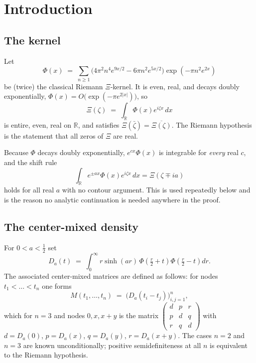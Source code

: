 \documentclass[11pt,a4paper]{amsart}
\theoremstyle{plain}
\theoremstyle{definition}
\newcommand{\RR}{\mathbb{R}}
\newcommand{\Xii}{\Xi}
\begin{document}
\maketitle

\section{Introduction}

\subsection{The kernel}
Let
\begin{equation}\label{eq:phi}
  \Phi(x)\;=\;\sum_{n\ge1}\bigl(4\pi^2n^4e^{9x/2}-6\pi n^2e^{5x/2}\bigr)\exp\!\left(-\pi n^2e^{2x}\right)
\end{equation}
be (twice) the classical Riemann $\Xii$-kernel. It is even, real, and decays doubly exponentially,
$\Phi(x)=O\bigl(\exp(-\pi e^{2|x|})\bigr)$, so
\begin{equation}\label{eq:xi}
  \Xii(\zeta)\;=\;\int_\RR\Phi(x)e^{i\zeta x}\,dx
\end{equation}
is entire, even, real on $\RR$, and satisfies $\Xii(\bar\zeta)=\overline{\Xii(\zeta)}$. The Riemann
hypothesis is the statement that all zeros of $\Xii$ are real.

Because $\Phi$ decays doubly exponentially, $e^{cx}\Phi(x)$ is integrable for \emph{every} real $c$,
and the shift rule
\begin{equation}\label{eq:shift}
  \int_\RR e^{\pm ax}\Phi(x)e^{i\zeta x}\,dx=\Xii(\zeta\mp ia)
\end{equation}
holds for all real $a$ with no contour argument. This is used repeatedly below and is the reason no
analytic continuation is needed anywhere in the proof.

\subsection{The center-mixed density}
For $0<a<\tfrac12$ set
\begin{equation}\label{eq:D}
  D_a(t)\;=\;\int_0^\infty r\sinh(ar)\,\Phi\!\left(\tfrac r2+t\right)\Phi\!\left(\tfrac r2-t\right)dr .
\end{equation}
The associated center-mixed matrices are defined as follows: for nodes
$t_1<\dots<t_n$ one forms
\begin{equation}\label{eq:matrix}
  M(t_1,\dots,t_n)\;=\;\bigl(D_a(t_i-t_j)\bigr)_{i,j=1}^n ,
\end{equation}
which for $n=3$ and nodes $0,x,x+y$ is the matrix
$\left(\begin{smallmatrix} d&p&r\\ p&d&q\\ r&q&d\end{smallmatrix}\right)$ with
$d=D_a(0)$, $p=D_a(x)$, $q=D_a(y)$, $r=D_a(x+y)$. The cases $n=2$ and $n=3$ are known
unconditionally; positive semidefiniteness at all $n$ is equivalent to the Riemann hypothesis.
\end{document}
